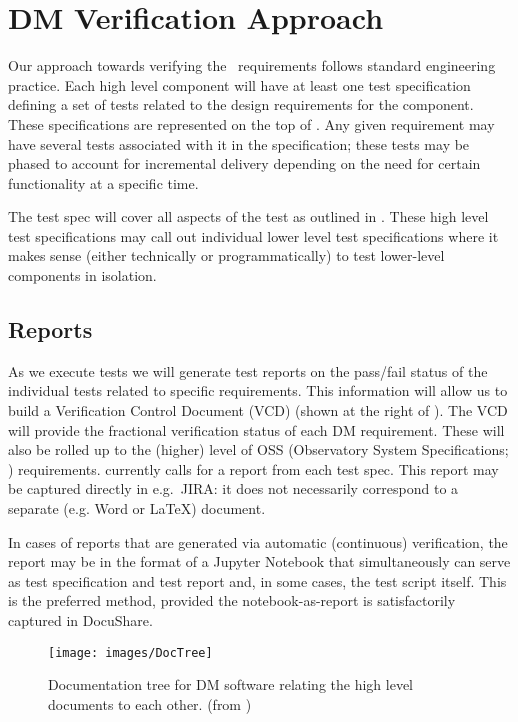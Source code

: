\section{DM Verification Approach \label{sect:approach}}

Our approach towards verifying the \product\ requirements follows
standard engineering practice.  Each high level component will have at
least one test specification defining a set of tests related to the
design requirements for the component.  These specifications are
represented on the top of . Any given requirement
may have several tests associated with it in the specification; these
tests may be phased to account for incremental delivery depending on
the need for certain functionality at a specific time.

The test spec will cover all aspects of the test as outlined in
. These high level test specifications may call
out individual lower level test specifications where it makes sense
(either technically or programmatically) to test lower-level components
in isolation.

\subsection{Reports}

As we execute tests we will generate test reports on the pass/fail status of the individual tests related to specific requirements.
This information will allow us to build a Verification Control Document (VCD) (shown at the right of ).
The VCD will provide the fractional verification status of each DM requirement.
These will also be rolled up to the (higher) level of OSS (Observatory System Specifications; ) requirements.
 currently calls for a report from each test spec.
This report may be captured directly in e.g.\ JIRA: it does not necessarily correspond to a separate (e.g. Word or LaTeX) document.

In cases of reports that are generated via automatic (continuous) verification, the report may be in the format of a Jupyter Notebook that simultaneously can serve as test specification and test report and, in some cases, the test script itself.
This is the preferred method, provided the notebook-as-report is satisfactorily captured in DocuShare.

\begin{figure}
\begin{center}
 \texttt{[image: images/DocTree]}
 \caption{Documentation tree for DM software relating the high level documents to each other. (from )\label{fig:doctree}}

 \end{center}
 \end{figure}


